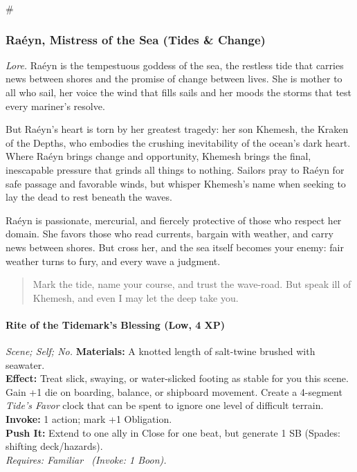 # %

\subsubsection{Raéyn, Mistress of the Sea (Tides \& Change)}
\textit{Lore.} Raéyn is the tempestuous goddess of the sea, the restless tide that carries news between shores and the promise of change between lives. She is mother to all who sail, her voice the wind that fills sails and her moods the storms that test every mariner's resolve.

But Raéyn's heart is torn by her greatest tragedy: her son Khemesh, the Kraken of the Depths, who embodies the crushing inevitability of the ocean's dark heart. Where Raéyn brings change and opportunity, Khemesh brings the final, inescapable pressure that grinds all things to nothing. Sailors pray to Raéyn for safe passage and favorable winds, but whisper Khemesh's name when seeking to lay the dead to rest beneath the waves.

Raéyn is passionate, mercurial, and fiercely protective of those who respect her domain. She favors those who read currents, bargain with weather, and carry news between shores. But cross her, and the sea itself becomes your enemy: fair weather turns to fury, and every wave a judgment.

\begin{quote}
Mark the tide, name your course, and trust the wave-road. But speak ill of Khemesh, and even I may let the deep take you.
\end{quote}

\paragraph*{Rite of the Tidemark's Blessing (Low, 4 XP)} \emph{Scene; Self; No.}
\textbf{Materials:} A knotted length of salt-twine brushed with seawater.\\
\textbf{Effect:} Treat slick, swaying, or water-slicked footing as stable for you this scene. Gain +1 die on boarding, balance, or shipboard movement. Create a 4-segment \emph{Tide's Favor} clock that can be spent to ignore one level of difficult terrain.\\
\textbf{Invoke:} 1 action; mark +1 Obligation.\\
\textbf{Push It:} Extend to one ally in Close for one beat, but generate 1 SB (Spades: shifting deck/hazards).\\
\emph{Requires: Familiar \ (\textit{Invoke:} 1 Boon).}

